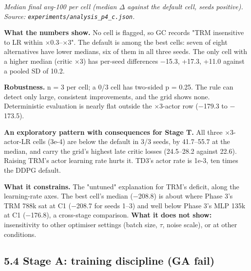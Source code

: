 \documentclass[11pt]{article}
\begin{document}
\emph{Median final avg-100 per cell (median $\Delta$ against the default cell, seeds positive). Source: \texttt{experiments/\allowbreak{}analysis\_\allowbreak{}p4\_\allowbreak{}c.\allowbreak{}json}.}



\textbf{What the numbers show.} No cell is flagged, so GC records "TRM insensitive to LR within $\times$0.3--$\times$3". The default is among the best cells: seven of eight alternatives have lower medians, six of them in all three seeds. The only cell with a higher median (critic $\times$3) has per-seed differences $-$15.3, +17.3, +11.0 against a pooled SD of 10.2.



\textbf{Robustness.} n = 3 per cell; a 0/3 cell has two-sided p = 0.25. The rule can detect only large, consistent improvements, and the grid shows none. Deterministic evaluation is nearly flat outside the $\times$3-actor row ($-$179.3 to $-$173.5).



\textbf{An exploratory pattern with consequences for Stage T.} All three $\times$3-actor-LR cells (3e-4) are below the default in 3/3 seeds, by 41.7--55.7 at the median, and carry the grid's highest late critic losses (24.5--28.2 against 22.6). Raising TRM's actor learning rate hurts it. TD3's actor rate is 1e-3, ten times the DDPG default.



\textbf{What it constrains.} The "untuned" explanation for TRM's deficit, along the learning-rate axes. The best cell's median ($-$208.8) is about where Phase 3's TRM 788k sat at C1 ($-$208.7 for seeds 1--3) and well below Phase 3's MLP 135k at C1 ($-$176.8), a cross-stage comparison. \textbf{What it does not show:} insensitivity to other optimiser settings (batch size, $\tau$, noise scale), or at other conditions.



\subsection*{5.4 Stage A: training discipline (GA fail)}
\end{document}
